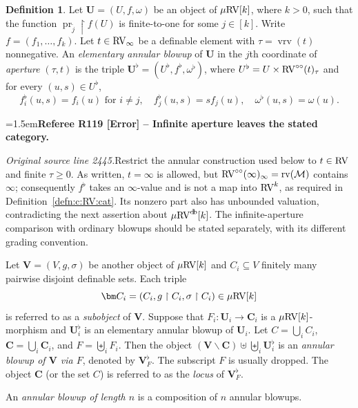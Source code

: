\documentclass[12pt]{amsart}
\newcommand{\RefereeRemark}[4]{%
  \par\medskip\begingroup\normalfont\small\color{RefereePurple}%
  \emergencystretch=1.5em\noindent\textbf{Referee R#1 [#2] -- #3.}\par\nobreak\noindent #4\par
  \endgroup\medskip
}
\newcommand{\memph}[1]{{\color{magenta}\emph{#1}}}
\theoremstyle{plain}
\theoremstyle{definition}
\newtheorem{defn}[thm]{Definition}
\theoremstyle{remark}
\numberwithin{equation}{section}
\theoremstyle{plain}
\newcommand{\RV}{\textup{RV}}
\newcommand{\MM}{\mdl M}
\DeclareMathOperator{\pr}{pr}
\newcommand{\0}{\emptyset}
\newcommand{\mdl}[1]{\mathcal{#1}}  %
\newcommand{\rest}{\upharpoonright}
\newcommand{\fun}{\longrightarrow}
\newcommand{\efun}{\longmapsto}
\newcommand{\sub}{\subseteq}
\newcommand{\mi}{\smallsetminus}
\newcommand{\mRV}{{\mu}{\RV}}
\DeclareMathOperator{\rv}{rv}
\DeclareMathOperator{\vrv}{vrv}
\DeclareMathOperator{\db}{d \! b}
\newcommand{\ccirc}{\circ \circ}
\begin{document}

\begin{defn}\label{defn:blowup:coa}
Let $\bm U = (U, f, \omega)$ be an object of $\mRV[k]$, where $k > 0$, such that the function $\pr_{\tilde j} \rest f(U)$ is finite-to-one for some $j \in [k]$. Write $f = (f_1, \ldots, f_k)$. Let $t \in \RV_\infty$ be a definable element with $\tau = \vrv(t)$ nonnegative.  An \memph{elementary annular blowup} of $\bm U$ in the $j$th coordinate of \memph{aperture} $(\tau, t)$ is the triple $\bm U^{\flat} = (U^{\flat}, f^{\flat}, \omega^\flat)$, where $U^{\flat} = U \times \RV^{\ccirc}(t)_{\tau}$ and for every $(u, s) \in U^{\flat}$,
\[
f^{\flat}_{i}(u, s) = f_{i}(u) \text{ for } i \neq j, \quad f^{\flat}_{j}(u, s) = s f_{j}(u), \quad \omega^\flat(u, s) = \omega(u).
\]

\RefereeRemark{119}{Error}{Infinite aperture leaves the stated category}{%
\textit{Original source line 2445.}\quad Restrict the annular construction used below to $t\in\RV$ and finite $\tau\geq0$. As written, $t=\infty$ is allowed, but $\RV^{\ccirc}(\infty)_\infty=\rv(\MM)$ contains $\infty$; consequently $f^\flat$ takes an $\infty$-value and is not a map into $\RV^k$, as required in Definition~\ref{defn:c:RV:cat}. Its nonzero part also has unbounded valuation, contradicting the next assertion about $\mRV^{\db}[k]$. The infinite-aperture comparison with ordinary blowups should be stated separately, with its different grading convention.
}

Let $\bm V = (V, g, \sigma)$ be another object of $\mRV[k]$ and $C_i \sub V$ finitely many pairwise disjoint definable sets. Each triple
\[
\bm C_i = (C_i, g \rest C_i, \sigma \rest C_i) \in \mRV[k]
\]
is referred to as a \memph{subobject} of $\bm V$. Suppose that $F_i : \bm U_i \fun \bm C_i$ is a $\mRV[k]$-morphism and $\bm U^{\flat}_i$ is an elementary annular blowup of $\bm U_i$. Let $C = \bigcup_i C_i$, $\bm C = \bigcup_i \bm C_i$,  and $F = \biguplus_i F_i$. Then the object
$
 (\bm V \mi \bm C) \uplus \biguplus_i \bm U_i^{\flat}
$
is  an \memph{annular blowup of $\bm V$ via $F$}, denoted by $\bm V^{\flat}_F$. The subscript $F$ is usually dropped. The object $\bm C$ (or the set $C$) is referred to as the \memph{locus} of $\bm V^{\flat}_F$.

An \memph{annular blowup of length $n$} is a composition of $n$ annular blowups.
\end{defn}
\end{document}
